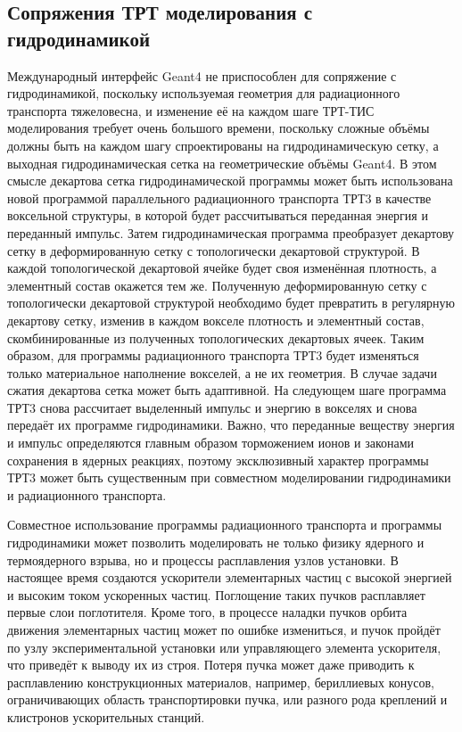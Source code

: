 \documentclass[a4paper,12pt]{article}
\begin{document}
\begin{large}
\subsection{Сопряжения ТРТ моделирования с гидродинамикой}
\label{Prac2}

	Международный интерфейс Geant4 не приспособлен для сопряжение с гидродинамикой, поскольку используемая геометрия для радиационного транспорта тяжеловесна, и изменение её на каждом шаге ТРТ-ТИС моделирования требует очень большого времени, поскольку сложные объёмы должны быть на каждом шагу спроектированы на гидродинамическую сетку, а выходная гидродинамическая сетка на геометрические объёмы Geant4.
	В этом смысле декартова сетка гидродинамической программы может быть использована новой программой параллельного радиационного транспорта ТРТ3 в качестве воксельной структуры, в которой будет рассчитываться переданная энергия и переданный импульс.
	Затем гидродинамическая программа преобразует декартову сетку в деформированную сетку с топологически декартовой структурой.
	В каждой топологической декартовой ячейке будет своя изменённая плотность, а элементный состав окажется тем же.
	Полученную деформированную сетку с топологически декартовой структурой необходимо будет превратить в регулярную декартову сетку, изменив в каждом вокселе плотность и элементный состав, скомбинированные из полученных топологических декартовых ячеек.
	Таким образом, для программы радиационного транспорта ТРТ3 будет изменяться только материальное наполнение вокселей, а не их геометрия.
	В случае задачи сжатия декартова сетка может быть адаптивной.
	На следующем шаге программа ТРТ3 снова рассчитает выделенный импульс и энергию в вокселях и снова передаёт их программе гидродинамики.
	Важно, что переданные веществу энергия и импульс определяются главным образом торможением ионов и законами сохранения в ядерных реакциях, поэтому эксклюзивный характер программы ТРТ3 может быть существенным при совместном моделировании гидродинамики и радиационного транспорта.

  Совместное использование программы радиационного транспорта и программы гидродинамики может позволить моделировать не только физику ядерного и термоядерного взрыва, но и процессы расплавления узлов установки.
  В настоящее время создаются ускорители элементарных частиц с высокой энергией и высоким током ускоренных частиц.
  Поглощение таких пучков расплавляет первые слои поглотителя.
  Кроме того, в процессе наладки пучков орбита движения элементарных частиц может по ошибке измениться, и пучок пройдёт по узлу экспериментальной установки или управляющего элемента ускорителя, что приведёт к выводу их из строя.
  Потеря пучка может даже приводить к расплавлению конструкционных материалов, например, бериллиевых конусов, ограничивающих область транспортировки пучка, или разного рода креплений и клистронов ускорительных станций.
	

\end{large}
\end{document}
